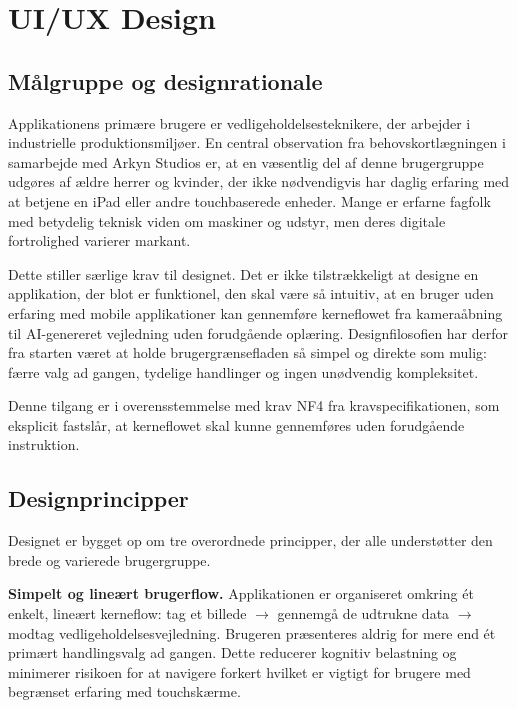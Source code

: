 \chapter{UI/UX Design}
\label{chap:ux}

\section{Målgruppe og designrationale}
\label{sec:målgruppe}

Applikationens primære brugere er vedligeholdelsesteknikere, der arbejder i industrielle produktionsmiljøer. En central observation fra behovskortlægningen i samarbejde med Arkyn Studios er, at en væsentlig del af denne brugergruppe udgøres af ældre herrer og kvinder, der ikke nødvendigvis har daglig erfaring med at betjene en iPad eller andre touchbaserede enheder. Mange er erfarne fagfolk med betydelig teknisk viden om maskiner og udstyr, men deres digitale fortrolighed varierer markant.

Dette stiller særlige krav til designet. Det er ikke tilstrækkeligt at designe en applikation, der blot er funktionel, den skal være så intuitiv, at en bruger uden erfaring med mobile applikationer kan gennemføre kerneflowet fra kameraåbning til AI-genereret vejledning uden forudgående oplæring. Designfilosofien har derfor fra starten været at holde brugergrænsefladen så simpel og direkte som mulig: færre valg ad gangen, tydelige handlinger og ingen unødvendig kompleksitet.

Denne tilgang er i overensstemmelse med krav NF4 fra kravspecifikationen, som eksplicit fastslår, at kerneflowet skal kunne gennemføres uden forudgående instruktion.

\section{Designprincipper}
\label{sec:designprincipper}

Designet er bygget op om tre overordnede principper, der alle understøtter den brede og varierede brugergruppe.

\textbf{Simpelt og lineært brugerflow.} Applikationen er organiseret omkring ét enkelt, lineært kerneflow: tag et billede $\rightarrow$ gennemgå de udtrukne data $\rightarrow$ modtag vedligeholdelsesvejledning. Brugeren præsenteres aldrig for mere end ét primært handlingsvalg ad gangen. Dette reducerer kognitiv belastning og minimerer risikoen for at navigere forkert hvilket er vigtigt for brugere med begrænset erfaring med touchskærme.

